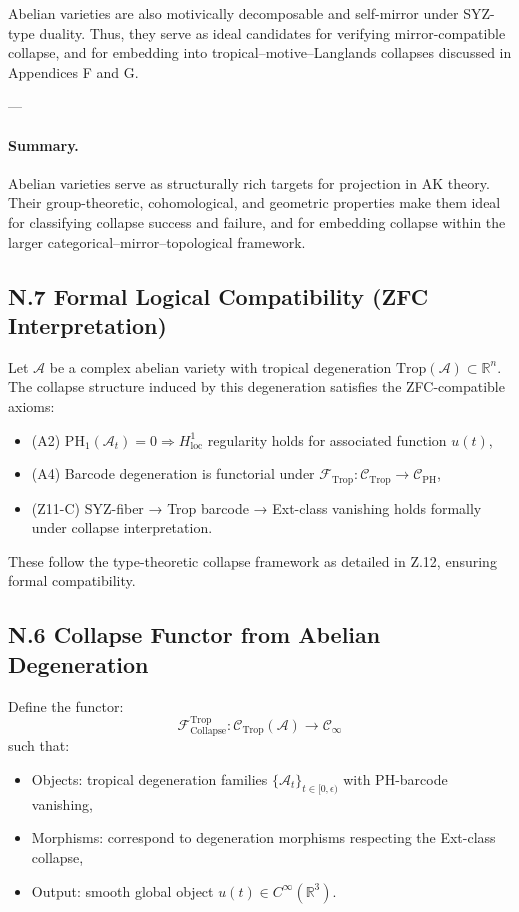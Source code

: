\documentclass[11pt]{article}
\begin{document}
\begin{axiom}
\begin{axiom}
{{Abelian varieties are also motivically decomposable and self-mirror under SYZ-type duality.  
Thus, they serve as ideal candidates for verifying mirror-compatible collapse, and for embedding into tropical–motive–Langlands collapses discussed in Appendices F and G.

---

\paragraph{Summary.}

Abelian varieties serve as structurally rich targets for projection in AK theory.  
Their group-theoretic, cohomological, and geometric properties make them ideal for classifying collapse success and failure, and for embedding collapse within the larger categorical–mirror–topological framework.


\subsection*{N.7 Formal Logical Compatibility (ZFC Interpretation)}

Let \( \mathcal{A} \) be a complex abelian variety with tropical degeneration \( \mathrm{Trop}(\mathcal{A}) \subset \mathbb{R}^n \).  
The collapse structure induced by this degeneration satisfies the ZFC-compatible axioms:

\begin{itemize}
  \item (A2) \( \mathrm{PH}_1(\mathcal{A}_t) = 0 \Rightarrow H^1_{\text{loc}} \) regularity holds for associated function \( u(t) \),
  \item (A4) Barcode degeneration is functorial under \( \mathcal{F}_{\mathrm{Trop}}: \mathcal{C}_{\text{Trop}} \to \mathcal{C}_{\mathrm{PH}} \),
  \item (Z11-C) SYZ-fiber → Trop barcode → Ext-class vanishing holds formally under collapse interpretation.
\end{itemize}

These follow the type-theoretic collapse framework as detailed in Z.12, ensuring formal compatibility.

\subsection*{N.6 Collapse Functor from Abelian Degeneration}

Define the functor:
\[
\mathcal{F}^{\mathrm{Trop}}_{\text{Collapse}}: \mathcal{C}_{\text{Trop}}(\mathcal{A}) \to \mathcal{C}_\infty
\]
such that:
\begin{itemize}
  \item Objects: tropical degeneration families \( \{ \mathcal{A}_t \}_{t \in [0,\epsilon)} \) with PH-barcode vanishing,
  \item Morphisms: correspond to degeneration morphisms respecting the Ext-class collapse,
  \item Output: smooth global object \( u(t) \in C^\infty(\mathbb{R}^3) \).
\end{itemize}

}}
\end{axiom}
\end{axiom}
\end{document}
